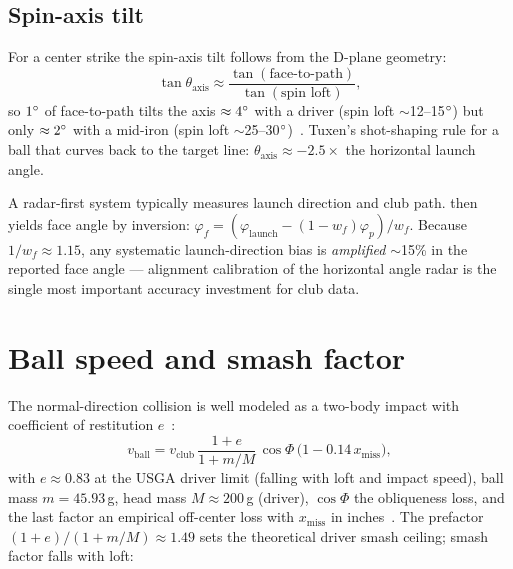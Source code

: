 \subsection{Spin-axis tilt}

For a center strike the spin-axis tilt follows from the D-plane geometry:
\begin{equation}
\label{eq:axistilt}
\tan\theta_{\mathrm{axis}} \approx
  \frac{\tan(\text{face-to-path})}{\tan(\text{spin loft})},
\end{equation}
so $1\si{\degree}$ of face-to-path tilts the axis $\approx4\si{\degree}$ with a driver
(spin loft $\sim$12--15$\si{\degree}$) but only $\approx2\si{\degree}$ with a mid-iron
(spin loft $\sim$25--30$\si{\degree}$)~\cite{perfectgolfswing}. Tuxen's
shot-shaping rule for a ball that curves back to the target line:
$\theta_{\mathrm{axis}} \approx -2.5\times$ the horizontal launch angle.

\begin{implication}
A radar-first system typically measures launch direction and club
path.  then yields face angle by inversion:
$\varphi_f = (\varphi_{\mathrm{launch}} - (1-w_f)\varphi_p)/w_f$. Because
$1/w_f \approx 1.15$, any systematic launch-direction bias is
\emph{amplified} $\sim$15\% in the reported face angle --- alignment
calibration of the horizontal angle radar is the single most important
accuracy investment for club data.
\end{implication}

\section{Ball speed and smash factor}
\label{sec:smash}

The normal-direction collision is well modeled as a two-body impact with
coefficient of restitution $e$~\cite{cochranstobbs,penner2003}:
\begin{equation}
\label{eq:ballspeed}
v_{\mathrm{ball}} = v_{\mathrm{club}}\,
  \frac{1+e}{1+m/M}\,\cos\Phi\,
  \bigl(1 - 0.14\,x_{\mathrm{miss}}\bigr),
\end{equation}
with $e \approx 0.83$ at the USGA driver limit (falling with loft and
impact speed), ball mass $m = 45.93$\,g, head mass $M \approx 200$\,g
(driver), $\cos\Phi$ the obliqueness loss, and the last factor an empirical
off-center loss with $x_{\mathrm{miss}}$ in inches~\cite{tutelmansmash}.
The prefactor $(1+e)/(1+m/M)\approx1.49$ sets the theoretical driver smash
ceiling; smash factor falls with loft:

